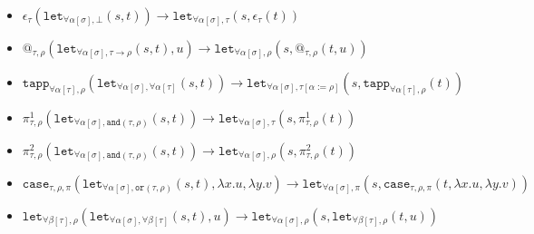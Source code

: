 \documentclass[runningheads,a4paper]{llncs}
\newcommand{\quant}[2]{\forall #1[#2]}
\newcommand{\qquant}[3]{#1 #2[#3]}
\newcommand{\red}{\longrightarrow}
\newcommand{\arrtype}{\rightarrow}
\newcommand{\abs}[2]{\lambda #1.#2}
\begin{document}
\begin{itemize}
\item $\epsilon_\tau(\mathtt{let}_{\qquant{\forall}{\alpha}{\sigma},
  \bot}(s,t)) \red
  \mathtt{let}_{\qquant{\forall}{\alpha}{\sigma},\tau}(s,\epsilon_\tau(t))$
\item $@_{\tau,\rho}(\mathtt{let}_{\qquant{\forall}{\alpha}{\sigma},
  \tau \arrtype \rho}(s,t),u) \red
  \mathtt{let}_{\qquant{\forall}{\alpha}{\sigma},\rho}(s,@_{\tau,\rho}(t,
  u))$
\item $\mathtt{tapp}_{\quant{\alpha}{\tau},\rho}(
\mathtt{let}_{\qquant{\forall}{\alpha}{\sigma},\quant{\alpha}{\tau}}(s,t))
  \red
  \mathtt{let}_{\qquant{\forall}{\alpha}{\sigma},\tau[\alpha:=\rho]}(s,
  \mathtt{tapp}_{\quant{\alpha}{\tau},\rho}(t))$
\item $\pi^1_{\tau,\rho}(\mathtt{let}_{\qquant{\forall}{\alpha}{\sigma},
  \mathtt{and}(\tau,\rho)}(s,t)) \red
  \mathtt{let}_{\qquant{\forall}{\alpha}{\sigma},\tau}(s,\pi^1_{\tau,
  \rho}(t))$
\item $\pi^2_{\tau,\rho}(\mathtt{let}_{\qquant{\forall}{\alpha}{\sigma},
  \mathtt{and}(\tau,\rho)}(s,t)) \red
  \mathtt{let}_{\qquant{\forall}{\alpha}{\sigma},\rho}(s,\pi^2_{\tau,
  \rho}(t))$
\item $\mathtt{case}_{\tau,\rho,\pi}(
  \mathtt{let}_{\qquant{\forall}{\alpha}{\sigma},\mathtt{or}(\tau,
  \rho)}(s,t),\abs{x}{u},\abs{y}{v}) \red
  \mathtt{let}_{\qquant{\forall}{\alpha}{\sigma},\pi}(s,\mathtt{case}_{
  \tau,\rho,\pi}(t,\abs{x}{u},\abs{y}{v}))$
\item $\mathtt{let}_{\qquant{\forall}{\beta}{\tau},\rho}(\mathtt{let}_{\qquant{\forall}{\alpha}{\sigma},\qquant{\forall}{\beta}{\tau}}(s,t),u) \red
  \mathtt{let}_{\qquant{\forall}{\alpha}{\sigma},\rho}(s,\mathtt{let}_{\qquant{\forall}{\beta}{\tau},\rho}(t,u))$
\end{itemize}
\end{document}
